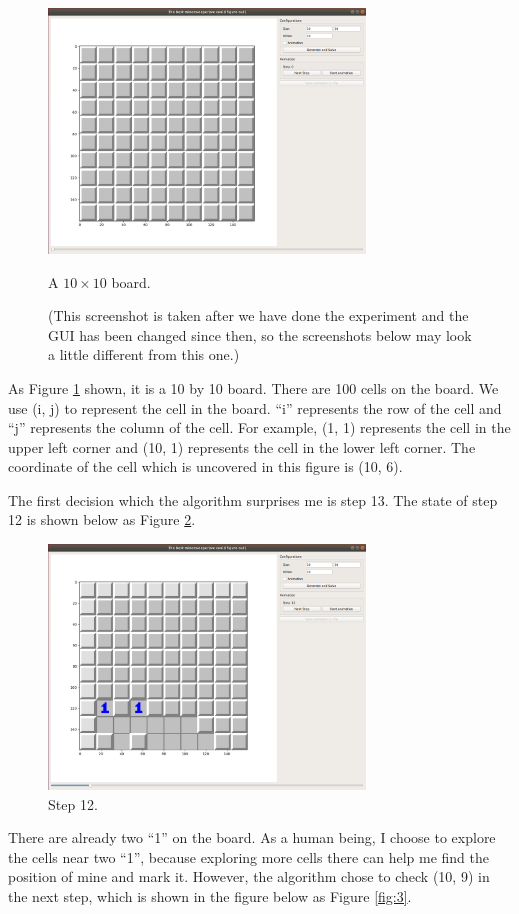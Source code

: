\documentclass[letter]{article}
\begin{document}
\begin{enumerate}
	\begin{figure}[H]
		\centering
		\includegraphics[width=0.75\textwidth]{../pics/1.png}
		\caption{\label{fig:1} A $ 10 \times 10 $ board. }
		\caption*{(This screenshot is taken after we have done the experiment and the GUI has been changed since then, so the screenshots below may look a little different from this one.)}
	\end{figure}
	As Figure \ref{fig:1} shown, it is a 10 by 10 board. There are 100 cells on the board. We use (i, j) to represent the cell in the board. ``i'' represents the row of the cell and ``j'' represents the column of the cell. For example, (1, 1) represents the cell in the upper left corner and (10, 1) represents the cell in the lower left corner. The coordinate of the cell which is uncovered in this figure is (10, 6).
	
	The first decision which the algorithm surprises me is step 13. The state of step 12 is shown below as Figure \ref{fig:2}.
	
	\begin{figure}[H]
		\centering
		\includegraphics[width=0.75\textwidth]{../pics/2.png}
		\caption{\label{fig:2} Step 12.}
	\end{figure}
	There are already two ``1'' on the board. As a human being, I choose to explore the cells near two ``1'', because exploring more cells there can help me find the position of mine and mark it. However, the algorithm chose to check (10, 9) in the next step, which is shown in the figure below as Figure \ref{fig:3}.
	

\end{enumerate}
\end{document}
